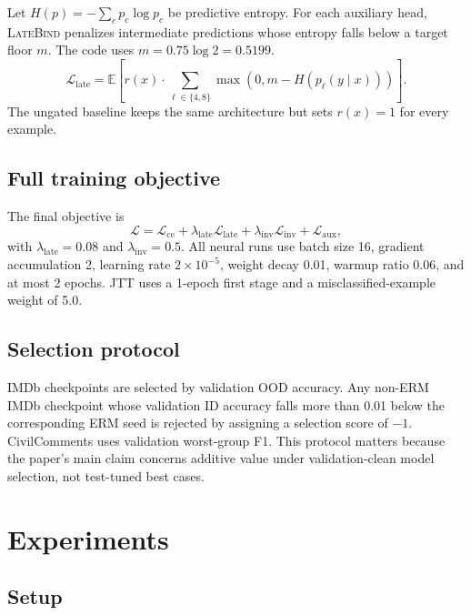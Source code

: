 \documentclass{article}
\newcommand{\LateBind}{\textsc{LateBind}}
\newcommand{\risk}{r(x)}
\newcommand{\ent}{H}
\begin{document}
Let $\ent(p) = -\sum_c p_c \log p_c$ be predictive entropy. For each auxiliary head, \LateBind{} penalizes intermediate predictions whose entropy falls below a target floor $m$. The code uses $m = 0.75 \log 2 = 0.5199$.
\begin{equation}
\mathcal{L}_{\mathrm{late}} = \mathbb{E}\left[\risk \cdot \sum_{\ell \in \{4,8\}} \max\left(0, m - \ent(p_\ell(y \mid x))\right)\right].
\end{equation}
The ungated baseline keeps the same architecture but sets $\risk = 1$ for every example.

\subsection{Full training objective}

The final objective is
\begin{equation}
\mathcal{L} = \mathcal{L}_{\mathrm{ce}} + \lambda_{\mathrm{late}}\mathcal{L}_{\mathrm{late}} + \lambda_{\mathrm{inv}}\mathcal{L}_{\mathrm{inv}} + \mathcal{L}_{\mathrm{aux}},
\end{equation}
with $\lambda_{\mathrm{late}} = 0.08$ and $\lambda_{\mathrm{inv}} = 0.5$. All neural runs use batch size 16, gradient accumulation 2, learning rate $2\times 10^{-5}$, weight decay 0.01, warmup ratio 0.06, and at most 2 epochs. JTT uses a 1-epoch first stage and a misclassified-example weight of 5.0.

\subsection{Selection protocol}

IMDb checkpoints are selected by validation OOD accuracy. Any non-ERM IMDb checkpoint whose validation ID accuracy falls more than 0.01 below the corresponding ERM seed is rejected by assigning a selection score of $-1$. CivilComments uses validation worst-group F1. This protocol matters because the paper's main claim concerns additive value under validation-clean model selection, not test-tuned best cases.

\section{Experiments}
\label{sec:experiments}

\subsection{Setup}
\end{document}
